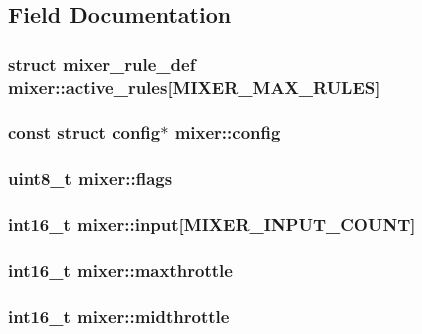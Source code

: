 \subsection{Field Documentation}
\hypertarget{structmixer_ac583adcc783a10244b5fd4e2d85f2fac}{
\subsubsection[{active\+\_\+rules}]{\setlength{\rightskip}{0pt plus 5cm}struct {\bf mixer\+\_\+rule\+\_\+def} mixer\+::active\+\_\+rules\mbox{[}{\bf M\+I\+X\+E\+R\+\_\+\+M\+A\+X\+\_\+\+R\+U\+L\+E\+S}\mbox{]}}}\label{structmixer_ac583adcc783a10244b5fd4e2d85f2fac}
\hypertarget{structmixer_aca479784a6e3381db854bd18219be34d}{
\subsubsection[{config}]{\setlength{\rightskip}{0pt plus 5cm}const struct {\bf config}$\ast$ mixer\+::config}}\label{structmixer_aca479784a6e3381db854bd18219be34d}
\hypertarget{structmixer_af3195e3b81f70f7a95ba822997217521}{
\subsubsection[{flags}]{\setlength{\rightskip}{0pt plus 5cm}uint8\+\_\+t mixer\+::flags}}\label{structmixer_af3195e3b81f70f7a95ba822997217521}
\hypertarget{structmixer_ad0374931c43851cc52e2151ae2fe9c66}{
\subsubsection[{input}]{\setlength{\rightskip}{0pt plus 5cm}int16\+\_\+t mixer\+::input\mbox{[}{\bf M\+I\+X\+E\+R\+\_\+\+I\+N\+P\+U\+T\+\_\+\+C\+O\+U\+N\+T}\mbox{]}}}\label{structmixer_ad0374931c43851cc52e2151ae2fe9c66}
\hypertarget{structmixer_a6b23844f6e43b9e81e17ab6b794fc8fe}{
\subsubsection[{maxthrottle}]{\setlength{\rightskip}{0pt plus 5cm}int16\+\_\+t mixer\+::maxthrottle}}\label{structmixer_a6b23844f6e43b9e81e17ab6b794fc8fe}
\hypertarget{structmixer_a3c6787d15c669ebad71e3f60bbc64cec}{
\subsubsection[{midthrottle}]{\setlength{\rightskip}{0pt plus 5cm}int16\+\_\+t mixer\+::midthrottle}}\label{structmixer_a3c6787d15c669ebad71e3f60bbc64cec}


